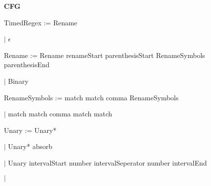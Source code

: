 
\textbf{CFG}

TimedRegex := Rename

\qquad	$\mid$ $\epsilon$

Rename := Rename renameStart parenthesisStart RenameSymbols parenthesisEnd

\qquad $\mid$ Binary

RenameSymbols := match match comma RenameSymbols

\qquad $\mid$ match match comma match match

Unary := Unary*

\qquad $\mid$ Unary* absorb

\qquad $\mid$ Unary intervalStart number intervalSeperator number intervalEnd

\qquad $\mid$ 
